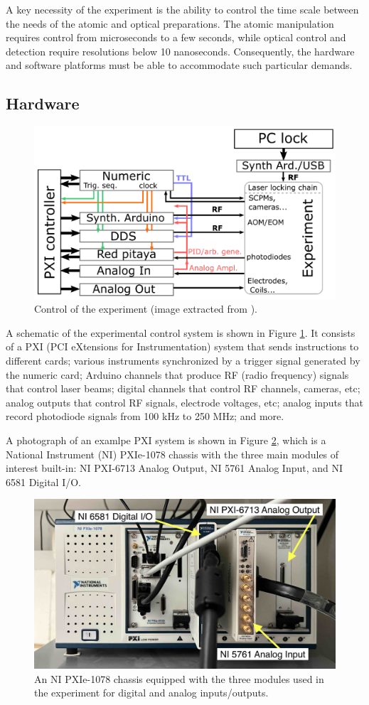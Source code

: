 A key necessity of the experiment is the ability to control the time scale between the needs of the atomic and optical preparations. The atomic manipulation requires control from microseconds to a few seconds, while optical control and detection require resolutions below 10 nanoseconds. Consequently, the hardware and software platforms must be able to accommodate such particular demands.

\subsection{Hardware}

\begin{figure}[ht]
    \centering
    \includegraphics[width=0.5\columnwidth]{images/chapter_1/control.png}
    \caption{Control of the experiment (image extracted from \cite{julien}).}
    \label{fig:ch1_control}
\end{figure}

A schematic of the experimental control system is shown in Figure \ref{fig:ch1_control}. It consists of a PXI (PCI eXtensions for Instrumentation) system that sends instructions to different cards; various instruments synchronized by a trigger signal generated by the numeric card; Arduino channels that produce RF (radio frequency) signals that control laser beams; digital channels that control RF channels, cameras, etc; analog outputs that control RF signals, electrode voltages, etc; analog inputs that record photodiode signals from 100 kHz to 250 MHz; and more.

A photograph of an examlpe PXI system is shown in Figure \ref{fig:ch1_chassis}, which is a National Instrument (NI) PXIe-1078 chassis with the three main modules of interest built-in: NI PXI-6713 Analog Output, NI 5761 Analog Input, and NI 6581 Digital I/O.

\begin{figure}[ht]
    \centering
    \includegraphics[width=0.6\columnwidth]{images/chapter_1/chassis.jpeg}
    \caption{An NI PXIe-1078 chassis equipped with the three modules used in the experiment for digital and analog inputs/outputs.}
    \label{fig:ch1_chassis}
\end{figure}

